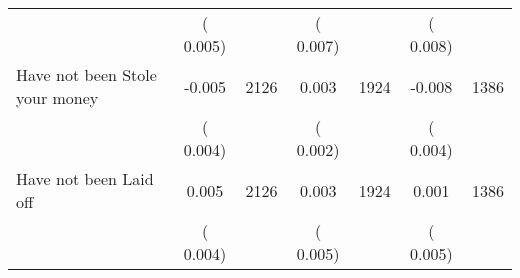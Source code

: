 \begin{tabular}{l*{6}{c}}
                       &       (       0.005)            &                               &       (       0.007)            &                               &       (       0.008)            &                               \\
Have not been Stole your money        &             -0.005      &       2126       &              0.003      &       1924       &             -0.008      &       1386       \\
                       &       (       0.004)            &                               &       (       0.002)            &                               &       (       0.004)            &                               \\
Have not been Laid off        &              0.005      &       2126       &              0.003      &       1924       &              0.001      &       1386       \\
                       &       (       0.004)            &                               &       (       0.005)            &                               &       (       0.005)            &                               \\
\hline \end{tabular}